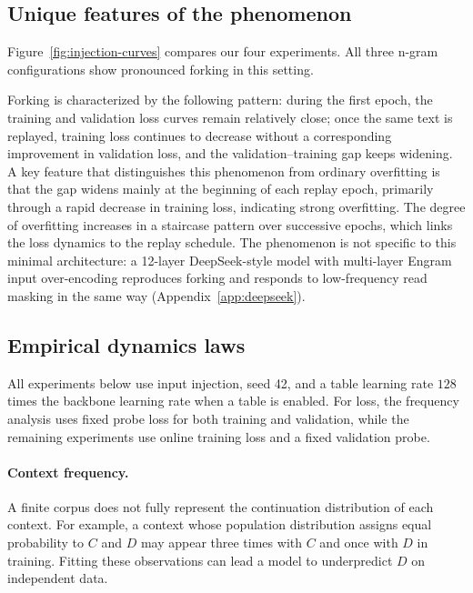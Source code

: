 \subsection{Unique features of the phenomenon}

Figure~\ref{fig:injection-curves} compares our four experiments. All three n-gram configurations show pronounced forking in this setting. 

Forking is characterized by the following pattern: during the first epoch, the training and validation loss curves remain relatively close; once the same text is replayed, training loss continues to decrease without a corresponding improvement in validation loss, and the validation--training gap keeps widening. A key feature that distinguishes this phenomenon from ordinary overfitting is that the gap widens mainly at the beginning of each replay epoch, primarily through a rapid decrease in training loss, indicating strong overfitting. The degree of overfitting increases in a staircase pattern over successive epochs, which links the loss dynamics to the replay schedule. The phenomenon is not specific to this minimal architecture: a 12-layer DeepSeek-style model with multi-layer Engram input over-encoding reproduces forking and responds to low-frequency read masking in the same way (Appendix~\ref{app:deepseek}).

\subsection{Empirical dynamics laws}
\label{sec:forking-factors}

All experiments below use input injection, seed 42, and a table learning rate $128$ times the backbone learning rate when a table is enabled. For loss, the frequency analysis uses fixed probe loss for both training and validation, while the remaining experiments use online training loss and a fixed validation probe.

\paragraph{Context frequency.}
A finite corpus does not fully represent the continuation distribution of each context. For example, a context whose population distribution assigns equal probability to $C$ and $D$ may appear three times with $C$ and once with $D$ in training. Fitting these observations can lead a model to underpredict $D$ on independent data.

